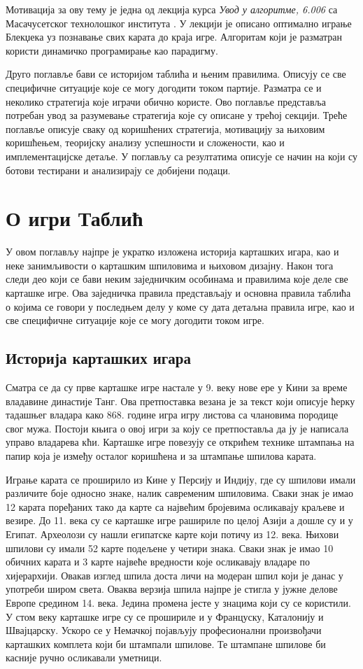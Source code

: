 \documentclass[a4paper, 12pt, ngerman]{article}
\let\oldsection\section
\renewcommand\section{\clearpage\oldsection}
\let\oldsubsection\subsection
\renewcommand\subsection{\clearpage\oldsubsection}
\newcommand{\quotesrb}[1]{\glqq#1\grqq}
\begin{document}
Мотивација за ову тему је једна од лекција курса \textit{Увод у алгоритме, 6.006} са Масачусетског технолошког института \cite{mit6006}. У лекцији је описано оптимално играње Блекџека уз познавање свих карата до краја игре. Алгоритам који је разматран користи динамичко програмирање као парадигму.

Друго поглавље бави се историјом таблића и њеним правилима. Описују се све специфичне ситуације које се могу догодити током партије. Разматра се и неколико стратегија које играчи обично користе. Ово поглавље представља потребан увод за разумевање стратегија које су описане у трећој секцији. Треће поглавље описује сваку од коришћених стратегија, мотивацију за њиховим коришћењем, теоријску анализу успешности и сложености, као и имплементацијске детаље. У поглављу са резултатима описује се начин на који су ботови тестирани и анализирају се добијени подаци. 



\section{О игри Таблић}
У овом поглављу најпре је укратко изложена историја карташких игара, као и неке занимљивости о карташким шпиловима и њиховом дизајну. Након тога следи део који се бави неким заједничким особинама и правилима које деле све карташке игре. Ова заједничка правила представљају и основна правила таблића о којима се говори у последњем делу у коме су дата детаљна правила игре, као и све специфичне ситуације које се могу догодити током игре.
\subsection{Историја карташких игара}
Сматра се да су прве карташке игре настале у 9. веку нове ере у Кини за време владавине династије Танг. Ова претпоставка везана је за текст који описује ћерку тадашњег владара како 868. године игра \quotesrb{игру листова} са члановима породице свог мужа. Постоји књига о овој игри за коју се претпоставља да ју је написала управо владарева кћи. Карташке игре повезују се открићем технике штампања на папир која је између осталог коришћена и за штампање шпилова карата.

Играње карата се проширило из Кине у Персију и Индију, где су шпилови имали различите боје односно знаке, налик савременим шпиловима. Сваки знак је имао 12 карата поређаних тако да карте са највећим бројевима осликавају краљеве и везире. До 11. века су се карташке игре рашириле по целој Азији а дошле су и у Египат. Археолози су нашли египатске карте који потичу из 12. века. Њихови шпилови су имали 52 карте подељене у четири знака. Сваки знак је имао 10 обичних карата и 3 карте највеће вредности које осликавају владаре по хијерархији. Овакав изглед шпила доста личи на модеран шпил који је данас у употреби широм света. Оваква верзија шпила најпре је стигла у јужне делове Европе средином 14. века. Једина промена јесте у знацима који су се користили. У стом веку карташке игре су се прошириле и у Француску, Каталонију и Швајцарску. Ускоро се у Немачкој појављују професионални произвођачи карташких комплета који би штампали шпилове. Те штампане шпилове би касније ручно осликавали уметници. 
\end{document}
